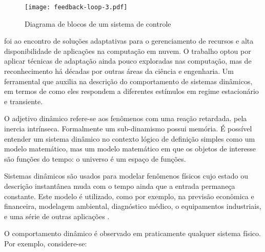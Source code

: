 \begin{figure}[htb]	
	\centering
	\texttt{[image: feedback-loop-3.pdf]}
	\caption{Diagrama de blocos de um sistema de controle}
	\label{fig:feedback-nobile}	
\end{figure}

 foi ao encontro de soluções adaptativas para o gerenciamento de recursos e alta disponibilidade de aplicações na computação em nuvem. O trabalho optou por aplicar técnicas de adaptação ainda pouco exploradas nas computação, mas de reconhecimento há décadas por outras áreas da ciência e engenharia. Um ferramental que auxilia na descrição do comportamento de sistemas dinâmicos, em termos de como eles respondem a diferentes estímulos em regime estacionário e transiente.

O adjetivo dinâmico refere-se aos fenômenos com uma reação retardada. pela inercia intrínseca. Formalmente um sub-dinamismo possui memória. É possível entender um sistema dinâmico no contexto lógico de definição simples como um modelo matemático, mas um modelo matemático em que os objetos de interesse são funções do tempo: o universo é um espaço de funções.

Sistemas dinâmicos são usados para modelar fenômenos físicos cujo estado ou descrição instantânea muda com o tempo ainda que a entrada permaneça constante. Este modelo é utilizado, como por exemplo, na previsão econômica e financeira, modelagem ambiental, diagnóstico médico, o equipamentos industriais, e uma série de outras aplicações \cite{Dean1991}.

O comportamento dinâmico é observado em praticamente qualquer sistema físico. Por exemplo, considere-se:

